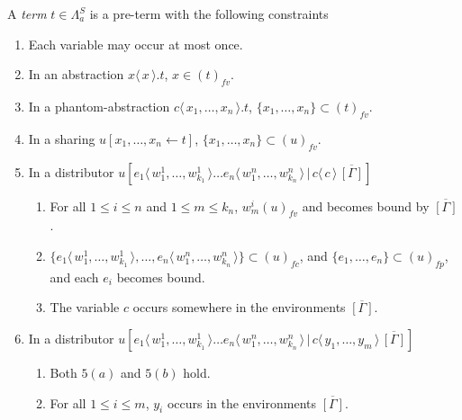 \documentclass[a4paper,UKenglish,cleveref, autoref]{lipics-v2019}
\newcommand{\FALC}{\Lambda^{S}_{a}}
\newcommand{\fv}[1]{(#1)_{fv}}
\newcommand{\fp}[1]{(#1)_{fp}}
\newcommand{\fc}[1]{(#1)_{fc}}
\newcommand{\set}[1]{ \{ #1 \} }
\newcommand{\fake}[3]{#1 \langle \, #2 \, \rangle . #3}
\newcommand{\share}[3]{#1 [#2 \leftarrow #3]}
\newcommand{\dist}[5]{#1 [ #2 \, \vert \, \fakedist{#4}{#5} \, #3 ]}
\newcommand{\fakedist}[2]{#1 \langle \, #2 \, \rangle}
\begin{document}
\begin{definition}[Terms]
\label{def:falcterms}
A \emph{term} $t \in \FALC$ is a pre-term with the following constraints
\begin{enumerate}
	\item  Each variable may occur at most once.
	\item In an abstraction $\fake{x}{x}{t}$, $x \in \fv{t}$.
	\item In a phantom-abstraction $\fake{c}{x_{1}, \dots, x_{n}}{t}$, $\set{x_{1}, \dots, x_{n}} \subset \fv{t}$.
	\item  In a sharing $\share{u}{x_{1}, \dots, x_{n}}{t}$, $\set{x_{1}, \dots, x_{n}} \subset \fv{u}$.
	\item  In a distributor $\dist{u}{\fakedist{e_{1}}{w^{1}_{1}, \dots, w^{1}_{k_{1}}} \dots \fakedist{e_{n}}{w^{n}_{1}, \dots, w^{n}_{k_{n}}}}{\overline{[\Gamma]}}{c}{c}$  
	\begin{enumerate}
		\item For all $1 \leq i \leq n$ and $1 \leq m \leq k_{n}$, $w^{i}_{m} \fv{u}$ and becomes bound by $\overline{[\Gamma]}$ .
		\item $\set{\fakedist{e_{1}}{w^{1}_{1}, \dots, w^{1}_{k_{1}}}, \dots, \fakedist{e_{n}}{w^{n}_{1}, \dots, w^{n}_{k_{n}}}} \subset \fc{u}$, and $\set{e_{1}, \dots, e_{n}} \subset \fp{u}$, and each $e_{i}$ becomes bound.
		\item The variable $c$ occurs somewhere in the environments $\overline{[\Gamma]}$.
	\end{enumerate}
	\item  In a distributor $\dist{u}{\fakedist{e_{1}}{w^{1}_{1}, \dots, w^{1}_{k_{1}}} \dots \fakedist{e_{n}}{w^{n}_{1}, \dots, w^{n}_{k_{n}}}}{\overline{[\Gamma]}}{c}{y_{1}, \dots, y_{m}}$  
	\begin{enumerate}
		\item Both $5(a)$ and $5(b)$ hold.
		\item For all $1 \leq i \leq m$, $y_{i}$ occurs in the environments $\overline{[\Gamma]}$.
	\end{enumerate}
\end{enumerate}

\end{definition}
\end{document}
